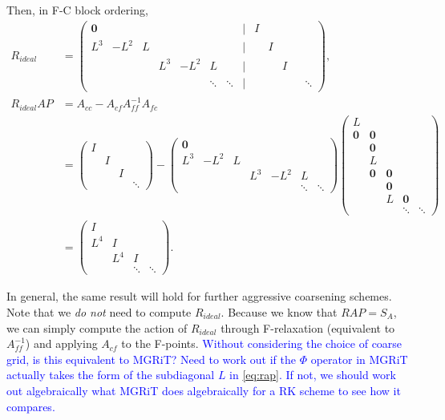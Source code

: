\documentclass[a4paper,12pt]{article}
\newcommand{\tcb}{\textcolor{blue}}
\begin{document}
%
Then, in F-C block ordering, 
%
\begin{align*}
R_{ideal} & = \begin{pmatrix} \mathbf{0} & & & & & & & \Big| & I \\ L^3 & -L^2 & L & & & & & \Big| & & I \\ & & & L^3 & -L^2 & L & & \Big| & & & I
	\\ & & & & & \ddots & \ddots & \Big| && && & \ddots\end{pmatrix}, \\
R_{ideal}AP & = A_{cc} - A_{cf}A_{ff}^{-1}A_{fc} \\
& = \begin{pmatrix} I \\ & I \\ & & I \\ & & & \ddots\end{pmatrix} - \begin{pmatrix} \mathbf{0} \\ L^3 & -L^2 & L \\ & & & L^3 & -L^2 & L \\ & & & &  & \ddots & \ddots\end{pmatrix}
	 \begin{pmatrix} L \\ \mathbf{0} & \mathbf{0}  \\ & \mathbf{0}  \\ & L \\ & \mathbf{0} & \mathbf{0} \\ & & \mathbf{0} \\
	& & L & \mathbf{0} \\ &&&\ddots&\ddots \end{pmatrix}\\
& = \begin{pmatrix} I \\ L^4 & I \\ & L^4 & I \\ && \ddots &\ddots\end{pmatrix}.
\end{align*}
%

In general, the same result will hold for further aggressive coarsening schemes. Note that we \textit{do not} need to compute $R_{ideal}$.
Because we know that $RAP = S_A$, we can simply compute the action of $R_{ideal}$ through F-relaxation (equivalent to $A_{ff}^{-1}$)
and applying $A_{cf}$ to the F-points. \tcb{Without considering the choice of coarse grid, is this equivalent to MGRiT? Need to work out if
the $\Phi$ operator in MGRiT actually takes the form of the subdiagonal $L$ in \eqref{eq:rap}. If not, we should work out algebraically what
MGRiT does algebraically for a RK scheme to see how it compares.}
\end{document}
